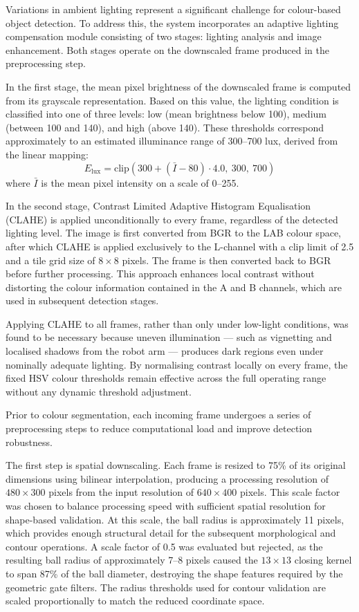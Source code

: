 Variations in ambient lighting represent a significant challenge for colour-based object
detection. To address this, the system incorporates an adaptive lighting compensation module
consisting of two stages: lighting analysis and image enhancement. Both stages operate on the
downscaled frame produced in the preprocessing step.

In the first stage, the mean pixel brightness of the downscaled frame is computed from its
grayscale representation. Based on this value, the lighting condition is classified into one of
three levels: low (mean brightness below 100), medium (between 100 and 140), and high (above
140). These thresholds correspond approximately to an estimated illuminance range of 300--700
lux, derived from the linear mapping:
\begin{equation}
    E_{\text{lux}} = \text{clip}\!\left(300 + (\bar{I} - 80) \cdot 4.0,\ 300,\ 700\right)
\end{equation}
where $\bar{I}$ is the mean pixel intensity on a scale of 0--255.

In the second stage, Contrast Limited Adaptive Histogram Equalisation (CLAHE) is applied
unconditionally to every frame, regardless of the detected lighting level. The image is first
converted from BGR to the LAB colour space, after which CLAHE is applied exclusively to the
L-channel with a clip limit of 2.5 and a tile grid size of $8 \times 8$ pixels. The frame is
then converted back to BGR before further processing. This approach enhances local contrast
without distorting the colour information contained in the A and B channels, which are used in
subsequent detection stages.

Applying CLAHE to all frames, rather than only under low-light conditions, was found to be
necessary because uneven illumination — such as vignetting and localised shadows from the
robot arm — produces dark regions even under nominally adequate lighting. By normalising
contrast locally on every frame, the fixed HSV colour thresholds remain effective across the
full operating range without any dynamic threshold adjustment.


Prior to colour segmentation, each incoming frame undergoes a series of
preprocessing steps to reduce computational load and improve detection robustness.

The first step is spatial downscaling. Each frame is resized to 75\% of its
original dimensions using bilinear interpolation, producing a processing resolution
of $480 \times 300$ pixels from the input resolution of $640 \times 400$ pixels.
This scale factor was chosen to balance processing speed with sufficient spatial
resolution for shape-based validation. At this scale, the ball radius is
approximately 11 pixels, which provides enough structural detail for the subsequent
morphological and contour operations. A scale factor of 0.5 was evaluated but
rejected, as the resulting ball radius of approximately 7--8 pixels caused the
$13 \times 13$ closing kernel to span 87\% of the ball diameter, destroying the
shape features required by the geometric gate filters. The radius thresholds used
for contour validation are scaled proportionally to match the reduced coordinate
space.

